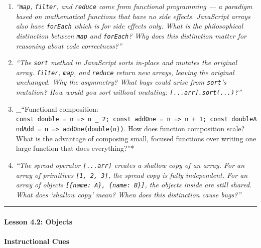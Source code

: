 \documentclass[
  justified,
  openright,
]{tufte-book}
\let\subsection\paragraph
\let\paragraph\paragraph
\let\subsection\paragraph
\let\paragraph\paragraph
\begin{document}
\begin{enumerate}
\def\labelenumi{\arabic{enumi}.}
\item
  \emph{``\texttt{map}, \texttt{filter}, and \texttt{reduce} come from
  functional programming --- a paradigm based on mathematical functions
  that have no side effects. JavaScript arrays also have
  \texttt{forEach} which is for side effects only. What is the
  philosophical distinction between \texttt{map} and \texttt{forEach}?
  Why does this distinction matter for reasoning about code
  correctness?''}
\item
  \emph{``The \texttt{sort} method in JavaScript sorts in-place and
  mutates the original array. \texttt{filter}, \texttt{map}, and
  \texttt{reduce} return new arrays, leaving the original unchanged. Why
  the asymmetry? What bugs could arise from \texttt{sort}'s mutation?
  How would you sort without mutating:
  \texttt{{[}...arr{]}.sort(...)}?''}
\item
  \_``Functional composition:
  \texttt{const\ double\ =\ n\ =\textgreater{}\ n\ \_\ 2;\ const\ addOne\ =\ n\ =\textgreater{}\ n\ +\ 1;\ const\ doubleAndAdd\ =\ n\ =\textgreater{}\ addOne(double(n))}.
  How does function composition scale? What is the advantage of
  composing small, focused functions over writing one large function
  that does everything?''*
\item
  \emph{``The spread operator \texttt{{[}...arr{]}} creates a shallow
  copy of an array. For an array of primitives \texttt{{[}1,\ 2,\ 3{]}},
  the spread copy is fully independent. For an array of objects
  \texttt{{[}\{name:\ \textquotesingle{}A\textquotesingle{}\},\ \{name:\ \textquotesingle{}B\textquotesingle{}\}{]}},
  the objects inside are still shared. What does `shallow copy' mean?
  When does this distinction cause bugs?''}
\end{enumerate}

\begin{center}\rule{0.5\linewidth}{0.5pt}\end{center}

\subsection{Lesson 4.2: Objects}\label{lesson-4.2-objects}

\paragraph{Instructional Cues}\label{instructional-cues-16}
\end{document}
